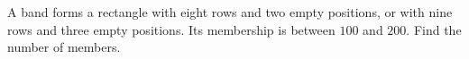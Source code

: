 A band forms a rectangle with eight rows and two empty positions, or with nine rows and three empty positions. Its membership is between $100$ and $200$. Find the number of members.
